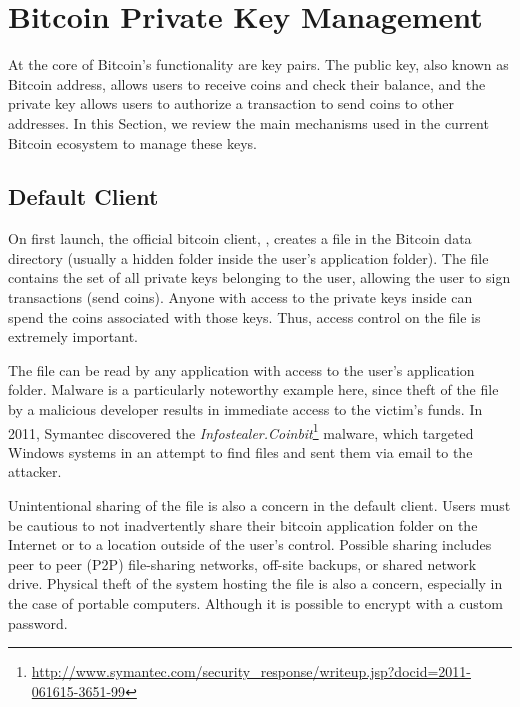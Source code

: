 
\section{Bitcoin Private Key Management}
At the core of Bitcoin's functionality are key pairs. The public key, also known as Bitcoin address, allows users to receive coins and check their balance, and the private key allows users to authorize a transaction to send coins to other addresses. In this Section, we review the main mechanisms used in the current Bitcoin ecosystem to manage these keys.

\subsection{Default Client}
On first launch, the official bitcoin client, \bitcoinclient, creates a \walletfile file in the Bitcoin data directory (usually a hidden folder inside the user's application folder). The \walletfile file contains the set of all private keys belonging to the user, allowing the user to sign transactions (\ie send coins). Anyone with access to the private keys inside \walletfile can spend the coins associated with those keys. Thus, access control on the \walletfile file is extremely important. 

The \walletfile file can be read by any application with access to the user's application folder. Malware is a particularly noteworthy example here, since theft of the \walletfile file by a malicious developer results in immediate access to the victim's funds. In 2011, Symantec discovered the \textit{Infostealer.Coinbit}\footnote{\url{http://www.symantec.com/security_response/writeup.jsp?docid=2011-061615-3651-99}} malware, which targeted Windows systems in an attempt to find \walletfile files and sent them via email to the attacker. 

Unintentional sharing of the \walletfile file is also a concern in the default client. Users must be cautious to not inadvertently share their bitcoin application folder on the Internet or to a location outside of the user's control. Possible sharing includes peer to peer (P2P) file-sharing networks, off-site backups, or shared network drive. Physical theft of the system hosting the \walletfile file is also a concern, especially in the case of portable computers. Although it is possible to encrypt \walletfile with a custom password.

